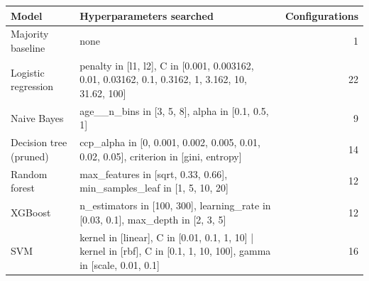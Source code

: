 \begin{tabular}{lp{10.5cm}r}
\toprule
\textbf{Model} & \textbf{Hyperparameters searched} & \textbf{Configurations} \\
\midrule
Majority baseline & none & 1 \\
Logistic regression & penalty in [l1, l2], C in [0.001, 0.003162, 0.01, 0.03162, 0.1, 0.3162, 1, 3.162, 10, 31.62, 100] & 22 \\
Naive Bayes & age\_\_n\_bins in [3, 5, 8], alpha in [0.1, 0.5, 1] & 9 \\
Decision tree (pruned) & ccp\_alpha in [0, 0.001, 0.002, 0.005, 0.01, 0.02, 0.05], criterion in [gini, entropy] & 14 \\
Random forest & max\_features in [sqrt, 0.33, 0.66], min\_samples\_leaf in [1, 5, 10, 20] & 12 \\
XGBoost & n\_estimators in [100, 300], learning\_rate in [0.03, 0.1], max\_depth in [2, 3, 5] & 12 \\
SVM & kernel in [linear], C in [0.01, 0.1, 1, 10] | kernel in [rbf], C in [0.1, 1, 10, 100], gamma in [scale, 0.01, 0.1] & 16 \\
\bottomrule
\end{tabular}
